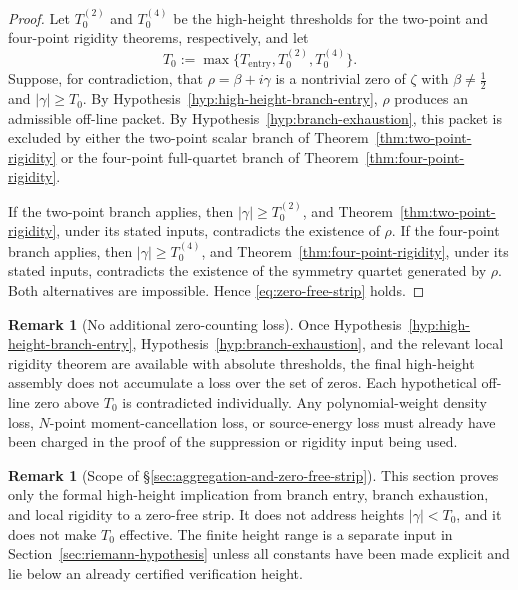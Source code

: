 \documentclass[11pt,a4paper]{amsart}
\numberwithin{equation}{section}
\theoremstyle{plain}
\theoremstyle{definition}
\newtheorem{remark}[theorem]{Remark}
\begin{document}
\begin{proof}
Let \(T_0^{(2)}\) and \(T_0^{(4)}\) be the high-height thresholds for the
two-point and four-point rigidity theorems, respectively, and let
\[
        T_0:=\max\{T_{\mathrm{entry}},T_0^{(2)},T_0^{(4)}\}.
\]
Suppose, for contradiction, that
\(\rho=\beta+i\gamma\) is a nontrivial zero of \(\zeta\) with
\(\beta\ne\tfrac12\) and \(|\gamma|\ge T_0\).  By
Hypothesis~\ref{hyp:high-height-branch-entry}, \(\rho\) produces an
admissible off-line packet.  By Hypothesis~\ref{hyp:branch-exhaustion}, this
packet is excluded by either the two-point scalar branch of
Theorem~\ref{thm:two-point-rigidity} or the four-point full-quartet branch of
Theorem~\ref{thm:four-point-rigidity}.

If the two-point branch applies, then \(|\gamma|\ge T_0^{(2)}\), and
Theorem~\ref{thm:two-point-rigidity}, under its stated inputs, contradicts the
existence of \(\rho\).  If the four-point branch applies, then
\(|\gamma|\ge T_0^{(4)}\), and Theorem~\ref{thm:four-point-rigidity}, under
its stated inputs, contradicts the existence of the symmetry quartet generated
by \(\rho\).  Both alternatives are impossible.  Hence
\eqref{eq:zero-free-strip} holds.
\end{proof}

\begin{remark}[No additional zero-counting loss]
\label{rem:zero-free-strip-no-aggregation-loss}
Once Hypothesis~\ref{hyp:high-height-branch-entry},
Hypothesis~\ref{hyp:branch-exhaustion}, and the relevant local rigidity theorem
are available with absolute thresholds, the final high-height assembly does not
accumulate a loss over the set of zeros.  Each hypothetical off-line zero above
\(T_0\) is contradicted individually.  Any polynomial-weight density loss,
\(N\)-point moment-cancellation loss, or source-energy loss must already have
been charged in the proof of the suppression or rigidity input being used.
\end{remark}

\begin{remark}[Scope of \S\ref{sec:aggregation-and-zero-free-strip}]
\label{rem:zero-free-strip-scope}
This section proves only the formal high-height implication from branch entry,
branch exhaustion, and local rigidity to a zero-free strip.  It does not address
heights \(|\gamma|<T_0\), and it does not make \(T_0\) effective.  The finite
height range is a separate input in Section~\ref{sec:riemann-hypothesis} unless
all constants have been made explicit and lie below an already certified
verification height.
\end{remark}
\end{document}
